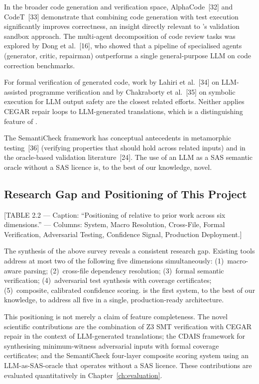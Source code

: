 In the broader code generation and verification space, AlphaCode~[32] and
CodeT~[33] demonstrate that combining code generation with test execution
significantly improves correctness, an insight directly relevant to
\codara{}'s validation sandbox approach. The multi-agent decomposition of code
review tasks was explored by Dong et al.~[16], who showed that a pipeline of
specialised agents (generator, critic, repairman) outperforms a single
general-purpose \ac{LLM} on code correction benchmarks.

For formal verification of generated code, work by Lahiri et al.~[34] on
\ac{LLM}-assisted programme verification and by Chakraborty et al.~[35] on
symbolic execution for \ac{LLM} output safety are the closest related efforts.
Neither applies \ac{CEGAR} repair loops to \ac{LLM}-generated translations,
which is a distinguishing feature of \codara{}.

The SemantiCheck framework has conceptual antecedents in metamorphic testing~[36]
(verifying properties that should hold across related inputs) and in the
oracle-based validation literature~[24]. The use of an \ac{LLM} as a SAS
semantic oracle without a SAS licence is, to the best of our knowledge, novel.

\subsection{Research Gap and Positioning of This Project}
\label{subsec:research-gap}

[TABLE 2.2 --- Caption: ``Positioning of \codara{} relative to prior work
across six dimensions.'' --- Columns: System, Macro Resolution, Cross-File,
Formal Verification, Adversarial Testing, Confidence Signal, Production
Deployment.]

The synthesis of the above survey reveals a consistent research gap. Existing
tools address at most two of the following five dimensions simultaneously:
(1)~macro-aware parsing; (2)~cross-file dependency resolution; (3)~formal
semantic verification; (4)~adversarial test synthesis with coverage
certificates; (5)~composite, calibrated confidence scoring. \codara{} is the
first system, to the best of our knowledge, to address all five in a single,
production-ready architecture.

This positioning is not merely a claim of feature completeness. The novel
scientific contributions are the combination of Z3 \ac{SMT} verification with
\ac{CEGAR} repair in the context of \ac{LLM}-generated translations; the
\ac{CDAIS} framework for synthesising minimum-witness adversarial inputs with
formal coverage certificates; and the SemantiCheck four-layer composite scoring
system using an \ac{LLM}-as-SAS-oracle that operates without a SAS licence.
These contributions are evaluated quantitatively in Chapter~\ref{ch:evaluation}.

